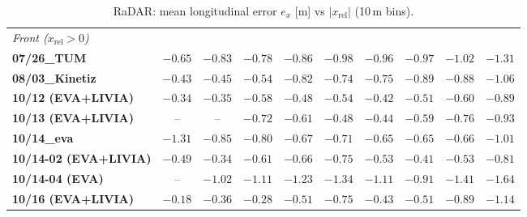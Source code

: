 \begin{table}[H]
\begin{tabular}{|lccccccccc|}
\hline
\multicolumn{10}{|l|}{\textit{Front ($x_{\mathrm{rel}}>0$)}} \\
\textbf{07/26\_TUM} & $-0.65$ & $-0.83$ & $-0.78$ & $-0.86$ & $-0.98$ & $-0.96$ & $-0.97$ & $-1.02$ & $-1.31$ \\
\textbf{08/03\_Kinetiz} & $-0.43$ & $-0.45$ & $-0.54$ & $-0.82$ & $-0.74$ & $-0.75$ & $-0.89$ & $-0.88$ & $-1.06$ \\
\textbf{10/12 (EVA+LIVIA)} & $-0.34$ & $-0.35$ & $-0.58$ & $-0.48$ & $-0.54$ & $-0.42$ & $-0.51$ & $-0.60$ & $-0.89$ \\
\textbf{10/13 (EVA+LIVIA)} & -- & -- & $-0.72$ & $-0.61$ & $-0.48$ & $-0.44$ & $-0.59$ & $-0.76$ & $-0.93$ \\
\textbf{10/14\_eva} & $-1.31$ & $-0.85$ & $-0.80$ & $-0.67$ & $-0.71$ & $-0.65$ & $-0.65$ & $-0.66$ & $-1.01$ \\
\textbf{10/14-02 (EVA+LIVIA)} & $-0.49$ & $-0.34$ & $-0.61$ & $-0.66$ & $-0.75$ & $-0.53$ & $-0.41$ & $-0.53$ & $-0.81$ \\
\textbf{10/14-04 (EVA)} & -- & $-1.02$ & $-1.11$ & $-1.23$ & $-1.34$ & $-1.11$ & $-0.91$ & $-1.41$ & $-1.64$ \\
\textbf{10/16 (EVA+LIVIA)} & $-0.18$ & $-0.36$ & $-0.28$ & $-0.51$ & $-0.75$ & $-0.43$ & $-0.51$ & $-0.89$ & $-1.14$ \\
\hline
\end{tabular}
\caption{RaDAR: mean longitudinal error $e_x$ [m] vs $|x_{\mathrm{rel}}|$ (10\,m bins).}
\label{tab:rad_ex}
\end{table}


